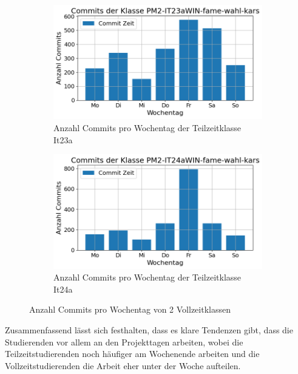 \begin{figure}[htbp]
    \centering
    \begin{subfigure}[b]{0.48\textwidth}
        \centering
        \includegraphics[width=\textwidth]{Figures/commits-klasse-per-wochentag-23a.png}
         \caption{Anzahl Commits pro Wochentag der Teilzeitklasse It23a}
        \label{fig:anzahl-commits-pro-wochentag-it23a}
    \end{subfigure}
    \hfill
    \begin{subfigure}[b]{0.48\textwidth}
        \centering
        \includegraphics[width=\textwidth]{Figures/commits-klasse-per-wochentag-24a.png}
         \caption{Anzahl Commits pro Wochentag der Teilzeitklasse It24a}
        \label{fig:anzahl-commits-pro-wochentag-it24a}
    \end{subfigure}
    \caption{Anzahl Commits pro Wochentag von 2 Vollzeitklassen}
    \label{fig:anz-commits-vollzeit-pro-wochentag}
\end{figure}

Zusammenfassend lässt sich festhalten, dass es klare Tendenzen gibt, dass die Studierenden vor allem an den Projekttagen arbeiten, wobei die Teilzeitstudierenden noch häufiger am Wochenende arbeiten und die Vollzeitstudierenden die Arbeit eher unter der Woche aufteilen.

